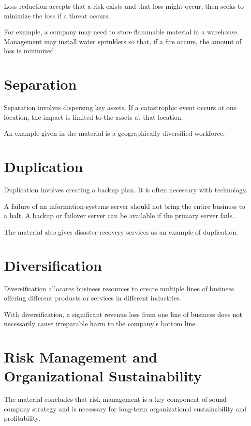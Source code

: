 \documentclass[
]{book}
\begin{document}
Loss reduction accepts that a risk exists and that loss might occur, then seeks to minimize the loss if a threat occurs.

For example, a company may need to store flammable material in a warehouse. Management may install water sprinklers so that, if a fire occurs, the amount of loss is minimized.

\section{Separation}\label{separation}

Separation involves dispersing key assets. If a catastrophic event occurs at one location, the impact is limited to the assets at that location.

An example given in the material is a geographically diversified workforce.

\section{Duplication}\label{duplication}

Duplication involves creating a backup plan. It is often necessary with technology.

A failure of an information-systems server should not bring the entire business to a halt. A backup or failover server can be available if the primary server fails.

The material also gives disaster-recovery services as an example of duplication.

\section{Diversification}\label{diversification}

Diversification allocates business resources to create multiple lines of business offering different products or services in different industries.

With diversification, a significant revenue loss from one line of business does not necessarily cause irreparable harm to the company's bottom line.

\section{Risk Management and Organizational Sustainability}\label{risk-management-and-organizational-sustainability}

The material concludes that risk management is a key component of sound company strategy and is necessary for long-term organizational sustainability and profitability.
\end{document}
